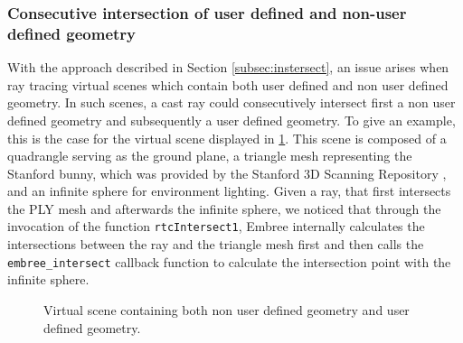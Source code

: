 \subsubsection{Consecutive intersection of user defined and non-user defined geometry}

With the approach described in Section \ref{subsec:instersect}, an issue arises when ray tracing virtual scenes which contain both user defined and non user defined geometry. In such scenes, a cast ray could consecutively intersect first a non user defined geometry and subsequently a user defined geometry. To give an example, this is the case for the virtual scene displayed in \ref{fig:no_bunny}. This scene is composed of a quadrangle serving as the ground plane, a triangle mesh representing the Stanford bunny, which was provided by the Stanford 3D Scanning Repository \cite{plyRepo} , and an infinite sphere for environment lighting.
Given a ray, that first intersects the PLY mesh and afterwards the infinite sphere, we noticed that through the invocation of the function \texttt{rtcIntersect1}, Embree internally calculates the intersections between the ray and the triangle mesh first and then calls the \texttt{embree\_intersect} callback function to calculate the intersection point with the infinite sphere.


\begin{figure}[!tbp]
	\centering
	\hfill
	\caption{Virtual scene containing both non user defined geometry and user defined geometry.}
	\label{fig:no_bunny}
\end{figure}

